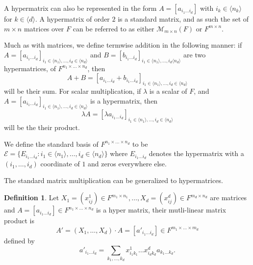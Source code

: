 \documentclass{report}
\theoremstyle{definition}
\newtheorem{defin}{Definition}
\theoremstyle{remark}
\begin{document}
A hypermatrix can also be represented in the form $A = [a_{i_1 \dots i_d}]$ with $i_k \in \langle n_k \rangle$ for $k \in \langle d \rangle$.
 A hypermatrix of order $2$ is a standard matrix, and as such the set of $m \times n$ matrices over $F$ can be referred to as either $\mathcal{M}_{m \times n}(F)$ or $ F ^{m \times n}$.

Much as with matrices, we define termwise addition in the following manner: if $A = [a_{i_1 \dots i_d}]_{i_1 \in \langle n_1 \rangle, \dots, i_d \in \langle n_d \rangle}$ and $B = [b_{i_1 \dots i_d}]_{i_1 \in \langle n_1 \rangle ,\dots, i_d \langle n_d \rangle}$ are two hypermatrices, of $F^{n_1 \times \dots \times n_d}$, then
\begin{equation*}
        A + B = [a_{i_1 \dots i_d} + b_{i_1 \dots i_d} ]_{i_1 \in \langle n_1 \rangle ,\dots, i_d \in \langle n_d \rangle}
\end{equation*}
will be their sum. For scalar multiplication, if $\lambda$ is a scalar of $F$, and $A = [a_{i_1 \dots i_d}]_{i_1 \in \langle n_1 \rangle ,\dots, i_d \in \langle n_d \rangle}$ is a hypermatrix, then
\begin{equation*}
        \lambda A = [\lambda a_{i_1 \dots i_d}]_{i_1 \in \langle n_1 \rangle ,\dots, i_d \in \langle n_d \rangle}
\end{equation*}
will be the their product.

We define the standard basis of $F^{n_1 \times \dots \times n_d}$ to be $\mathcal{E} = \{ E_{i_1 \dots i_d}: i_1 \in \langle n_1 \rangle , \dots , i_d \in \langle n_d \rangle \} $ where $ E_{i_1 \dots i_d}$ denotes the hypermatrix with a $(i_1, \dots, i_d)$ coordinate of $1$ and zeros everywhere else.

The standard matrix multiplication can be generalized to hypermatrices.

\begin{defin}
        Let $X_1 = (x_{ij}^1) \in F^{m_1 \times n_1}, \dots , X_d = (x_{ij}^d) \in F^{m_d \times n_d}$ are matrices and $A = [a_{i_1 \dots i_d}] \in F^{n_1 \times \dots \times n_d}$ is a hyper matrix, their mutli-linear matrix product is
        \begin{equation*}
                A' = (X_1, \dots, X_d) \cdot A = [a'_{i_1 \dots i_d}] \in F^{m_1 \times \dots \times m_d} 
        \end{equation*}
        defined by
        \begin{equation*}
                a'_{i_1 \dots i_d} = \sum_{k_1, \dots, k_d} x^1_{i_1 k_1}\dots x^d_{i_d k_d}a_{k_1 \dots k_d}.
        \end{equation*}
\end{defin}
\end{document}
